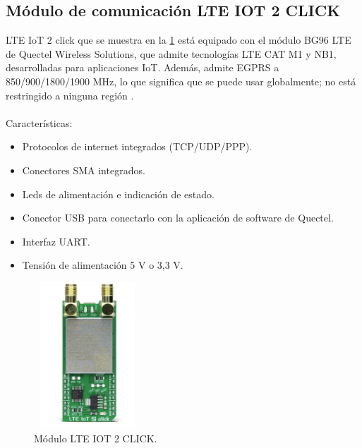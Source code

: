 \subsection{Módulo de comunicación LTE IOT 2 CLICK}
\label{subsec:ejemplo}
LTE IoT 2 click que se muestra en la \ref{fig:modulo LTE IOT} está equipado con el módulo BG96 LTE de Quectel Wireless Solutions, que admite tecnologías LTE CAT M1 y NB1, desarrolladas para aplicaciones IoT. Además, admite EGPRS a 850/900/1800/1900 MHz, lo que significa que se puede usar globalmente; no está restringido a ninguna región \citep{MonuloLTE-IOT}.
\\ 
\\Características:
\begin{itemize}
	\item Protocolos de internet integrados (TCP/UDP/PPP).
	\item Conectores SMA integrados.
	\item Leds de alimentación e indicación de estado.
	\item Conector USB para conectarlo con la aplicación de software de Quectel.
	\item Interfaz UART. 
	\item Tensión de alimentación 5 V o 3,3 V.
\end{itemize}
\begin{figure}[htbp]
	\centering
	\includegraphics[width=4cm, height=5.5cm]{./Figures/moduloBG96.png}
	\caption{Módulo LTE IOT 2 CLICK\protect\footnotemark.}
	\label{fig:modulo LTE IOT}
\end{figure}

